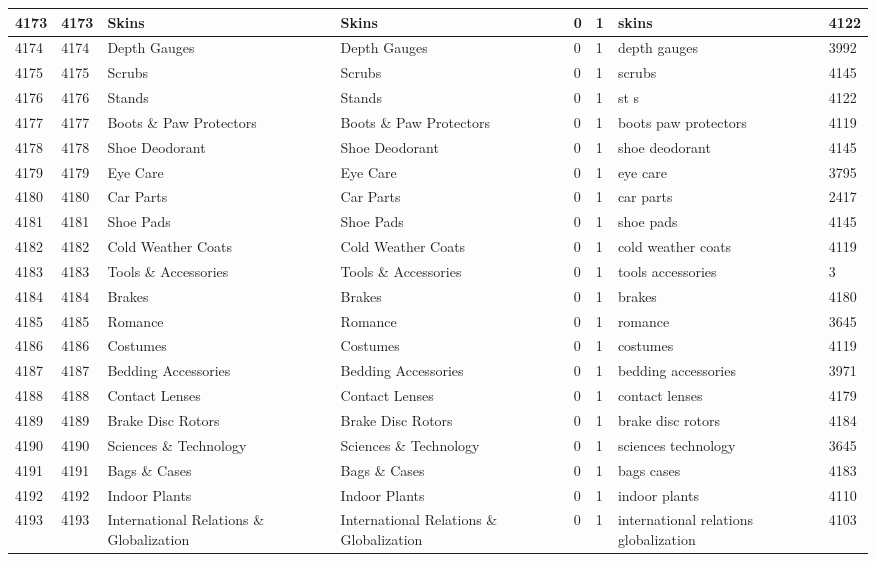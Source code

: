 \begin{longtable}{|l|l|l|l|l|l|l|l|}
4173 & 4173 & Skins & Skins & 0 & 1 & skins & 4122 \\ \hline 
4174 & 4174 & Depth Gauges & Depth Gauges & 0 & 1 & depth gauges & 3992 \\ \hline 
4175 & 4175 & Scrubs & Scrubs & 0 & 1 & scrubs & 4145 \\ \hline 
4176 & 4176 & Stands & Stands & 0 & 1 & st s & 4122 \\ \hline 
4177 & 4177 & Boots \& Paw Protectors & Boots \& Paw Protectors & 0 & 1 & boots paw protectors & 4119 \\ \hline 
4178 & 4178 & Shoe Deodorant & Shoe Deodorant & 0 & 1 & shoe deodorant & 4145 \\ \hline 
4179 & 4179 & Eye Care & Eye Care & 0 & 1 & eye care & 3795 \\ \hline 
4180 & 4180 & Car Parts & Car Parts & 0 & 1 & car parts & 2417 \\ \hline 
4181 & 4181 & Shoe Pads & Shoe Pads & 0 & 1 & shoe pads & 4145 \\ \hline 
4182 & 4182 & Cold Weather Coats & Cold Weather Coats & 0 & 1 & cold weather coats & 4119 \\ \hline 
4183 & 4183 & Tools \& Accessories & Tools \& Accessories & 0 & 1 & tools accessories & 3 \\ \hline 
4184 & 4184 & Brakes & Brakes & 0 & 1 & brakes & 4180 \\ \hline 
4185 & 4185 & Romance & Romance & 0 & 1 & romance & 3645 \\ \hline 
4186 & 4186 & Costumes & Costumes & 0 & 1 & costumes & 4119 \\ \hline 
4187 & 4187 & Bedding Accessories & Bedding Accessories & 0 & 1 & bedding accessories & 3971 \\ \hline 
4188 & 4188 & Contact Lenses & Contact Lenses & 0 & 1 & contact lenses & 4179 \\ \hline 
4189 & 4189 & Brake Disc Rotors & Brake Disc Rotors & 0 & 1 & brake disc rotors & 4184 \\ \hline 
4190 & 4190 & Sciences \& Technology & Sciences \& Technology & 0 & 1 & sciences technology & 3645 \\ \hline 
4191 & 4191 & Bags \& Cases & Bags \& Cases & 0 & 1 & bags cases & 4183 \\ \hline 
4192 & 4192 & Indoor Plants & Indoor Plants & 0 & 1 & indoor plants & 4110 \\ \hline 
4193 & 4193 & International Relations \& Globalization & International Relations \& Globalization & 0 & 1 & international relations globalization & 4103 \\ \hline 

\end{longtable}
